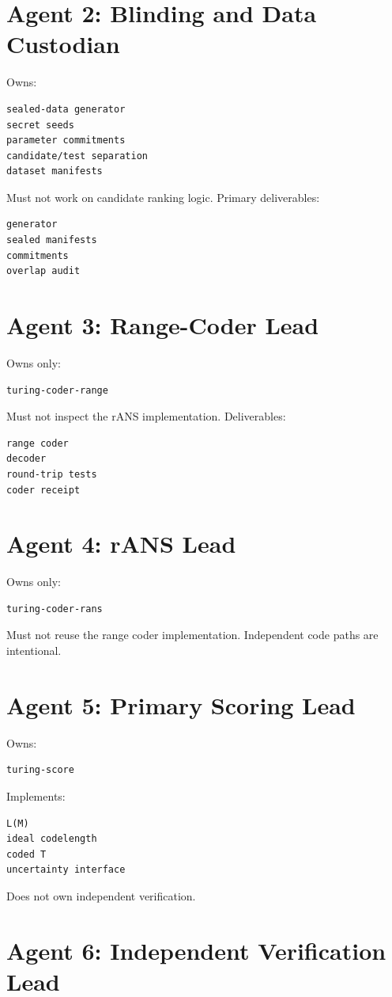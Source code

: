 \documentclass[11pt]{article}
\begin{document}
\section{Agent 2: Blinding and Data Custodian}

Owns:
\begin{verbatim}
sealed-data generator
secret seeds
parameter commitments
candidate/test separation
dataset manifests
\end{verbatim}
Must not work on candidate ranking logic. Primary deliverables:
\begin{verbatim}
generator
sealed manifests
commitments
overlap audit
\end{verbatim}

\section{Agent 3: Range-Coder Lead}

Owns only:
\begin{verbatim}
turing-coder-range
\end{verbatim}
Must not inspect the rANS implementation. Deliverables:
\begin{verbatim}
range coder
decoder
round-trip tests
coder receipt
\end{verbatim}

\section{Agent 4: rANS Lead}

Owns only:
\begin{verbatim}
turing-coder-rans
\end{verbatim}
Must not reuse the range coder implementation. Independent code paths are intentional.

\section{Agent 5: Primary Scoring Lead}

Owns:
\begin{verbatim}
turing-score
\end{verbatim}
Implements:
\begin{verbatim}
L(M)
ideal codelength
coded T
uncertainty interface
\end{verbatim}
Does not own independent verification.

\section{Agent 6: Independent Verification Lead}
\end{document}
